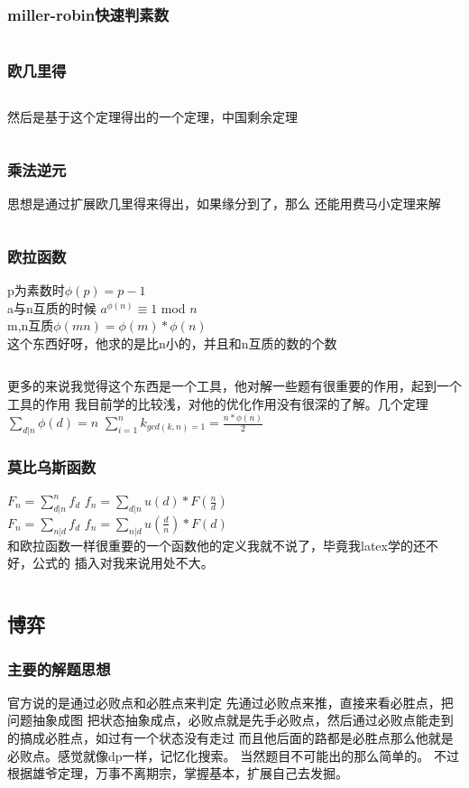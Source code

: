 \documentclass[a4paper,13.6pt]{article}
\begin{document}
\begin{CJK}{UTF8}{gbsn}
\subsubsection{miller-robin快速判素数}
\inputminted{c++}{../scoure/math/miller_robin.cpp}
\subsubsection{欧几里得}
\inputminted{c++}{../scoure/math/GCD.cpp}
然后是基于这个定理得出的一个定理，中国剩余定理
\inputminted{c++}{../scoure/math/chineseshengyu.cpp}
\subsubsection{乘法逆元}
思想是通过扩展欧几里得来得出，如果缘分到了，那么
还能用费马小定理来解
\inputminted{c++}{../scoure/math/niyuan.cpp}
\subsubsection{欧拉函数}
p为素数时$\phi(p) = p-1 $\\
a与n互质的时候 $a^{\phi(n)}\equiv 1$ mod $ n$\\
m,n互质$\phi(mn) = \phi(m) * \phi(n)$\\

这个东西好呀，他求的是比n小的，并且和n互质的数的个数
\inputminted{c++}{../scoure/math/oula.cpp}
更多的来说我觉得这个东西是一个工具，他对解一些题有很重要的作用，起到一个工具的作用
我目前学的比较浅，对他的优化作用没有很深的了解。几个定理\\
$\sum_{d|n}\phi(d) = n$ \qquad $\sum_{i=1}^n k_{gcd(k,n) = 1} = \frac{n*\phi(n)}{2}$
\subsubsection{莫比乌斯函数}
$F_n = \sum_{d|n}^n f_d$
$f_n = \sum_{d|n} u(d)*F(\frac{n}{d})$\\
$F_n = \sum_{n|d} f_d$
$f_n = \sum_{n|d} u(\frac{d}{n})*F(d)$\\
和欧拉函数一样很重要的一个函数他的定义我就不说了，毕竟我latex学的还不好，公式的
插入对我来说用处不大。
\inputminted{c++}{../scoure/math/mobius.cpp}
\newpage
\subsection{博弈}
\subsubsection{主要的解题思想}
官方说的是通过必败点和必胜点来判定
先通过必败点来推，直接来看必胜点，把问题抽象成图 把状态抽象成点，必败点就是先手必败点，然后通过必败点能走到的搞成必胜点，如过有一个状态没有走过 而且他后面的路都是必胜点那么他就是必败点。感觉就像dp一样，记忆化搜索。
当然题目不可能出的那么简单的。
不过根据雄爷定理，万事不离期宗，掌握基本，扩展自己去发掘。

\end{CJK}
\end{document}
